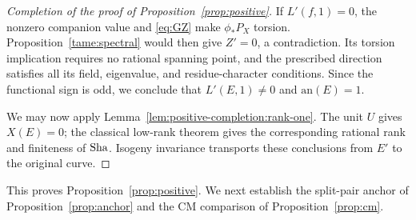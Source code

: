 \begin{proof}[Completion of the proof of Proposition~\ref{prop:positive}]
If \(L'(f,1)=0\), the nonzero companion value and \eqref{eq:GZ}
make \(\phi_*P_X\) torsion. Proposition~\ref{tame:spectral} would then
give \(Z'=0\), a contradiction. Its torsion implication requires no
rational spanning point, and the prescribed direction satisfies all
its field, eigenvalue, and residue-character conditions. Since the
functional sign is odd, we conclude that \(L'(E,1)\ne0\) and
\(\mathrm{an}(E)=1\).

We may now apply Lemma~\ref{lem:positive-completion:rank-one}.
The unit \(U\) gives \(X(E)=0\); the classical low-rank theorem gives
the corresponding rational rank and finiteness of \(\operatorname{Sha}\). Isogeny
invariance transports these conclusions from \(E'\) to the original
curve.
\end{proof}  

This proves Proposition~\ref{prop:positive}. We next establish the split-pair
anchor of Proposition~\ref{prop:anchor} and the CM comparison of
Proposition~\ref{prop:cm}.

